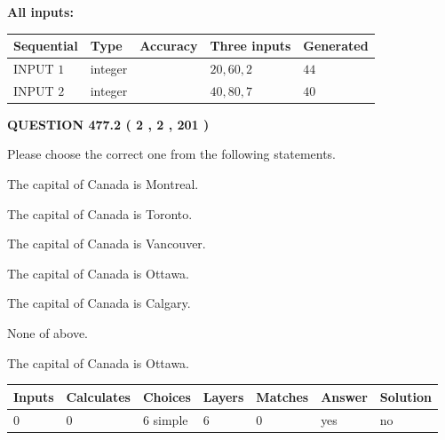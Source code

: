 \documentclass[12pt]{article}
\begin{document}
   
   
   
\noindent\vspace{0.1in}\hspace{-0.08in} {\textbf{\Large{All inputs: }}}
   
   
  
  
\noindent\begin{tabular}{|l|l|l|l|l|}
\hline
 Sequential & Type & Accuracy & Three inputs & Generated \\ 
\hline
 
 
  INPUT $  1 $ & integer &  & $
 20
 , 
 60
 , 
 2
 $ & $ 44 $ 
 \\  \hline  
 
 
  INPUT $  2 $ & integer &  & $
 40
 , 
 80
 , 
 7
 $ & $ 40 $ 
 \\  \hline  
 \end{tabular}
   
   
  
\vspace{0.2in}
  
{\textbf{\Large{QUESTION
477.2 
 ( 2 , 2 , 201 )
}}}
  
  
Please choose the correct one from the following statements.
 
 
The capital of Canada is Montreal.
 
 
The capital of Canada is Toronto.
 
 
The capital of Canada is Vancouver.
 
 
The capital of Canada is Ottawa.
 
 
The capital of Canada is Calgary.
 
 
 None of above.
 
 
\noindent{}
 
 
The capital of Canada is Ottawa.
 
 
\noindent{}
 
 
   
   
   
   
\noindent\begin{tabular}{|l|l|l|l|l|l|l|}
 \hline
Inputs & Calculates & Choices & Layers & Matches & Answer & Solution \\ \hline
 0  & 
 0  & 
 6
  simple  
  & 
 6  & 
 0  & 
  yes & 
  no 
  \\ \hline
 \end{tabular}
   
\end{document}
